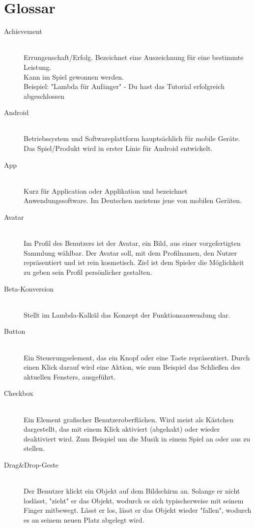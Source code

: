 \section{Glossar}

\begin{description}
	\item[Achievement] \hfill \\
	Errungenschaft/Erfolg. Bezeichnet eine Auszeichnung für eine bestimmte Leistung.\\
	Kann im Spiel gewonnen werden.\\
	Beispiel: "Lambda für Anfänger" - Du hast das Tutorial erfolgreich abgeschlossen
	
	\item[Android] \hfill \\
	Betriebssystem und Softwareplattform hauptsächlich für mobile Geräte. Das Spiel/Produkt wird in erster Linie 
	für Android entwickelt.
	
	\item[App] \hfill \\
	Kurz für Application oder Applikation und bezeichnet Anwendungssoftware. Im Deutschen meistens jene von mobilen Geräten.
	
	\item[Avatar] \hfill \\
	Im Profil des Benutzers ist der Avatar, ein Bild, aus einer vorgefertigten Sammlung wählbar.
	Der Avatar soll, mit dem Profilnamen, den Nutzer repräsentiert und ist rein kosmetisch.
	Ziel ist dem Spieler die Möglichkeit zu geben sein Profil persönlicher gestalten.
	
	\item[Beta-Konversion] \hfill \\
	Stellt im Lambda-Kalkül das Konzept der Funktionsanwendung dar.
	
	\item[Button] \hfill \\
	Ein Steuerungselement, das ein Knopf oder eine Taste repräsentiert. Durch einen Klick darauf wird eine Aktion, wie zum Beispiel
	das Schließen des aktuellen Fensters, ausgeführt.
	
	\item[Checkbox] \hfill \\
	Ein Element grafischer Benutzeroberflächen. Wird meist als Kästchen dargestellt, das mit einem Klick aktiviert (abgehakt) oder
	wieder deaktiviert wird. Zum Beispiel um die Musik in einem Spiel an oder aus zu stellen.
	
	\item[Drag\&Drop-Geste] \hfill \\
	Der Benutzer klickt ein Objekt auf dem Bildschirm an. Solange er nicht loslässt, "zieht" er das Objekt, wodurch
	es sich typischerweise mit seinem Finger mitbewegt. Lässt er los, lässt er das Objekt wieder "fallen", wodurch
	es an seinem neuen Platz abgelegt wird.
	

\end{description}
